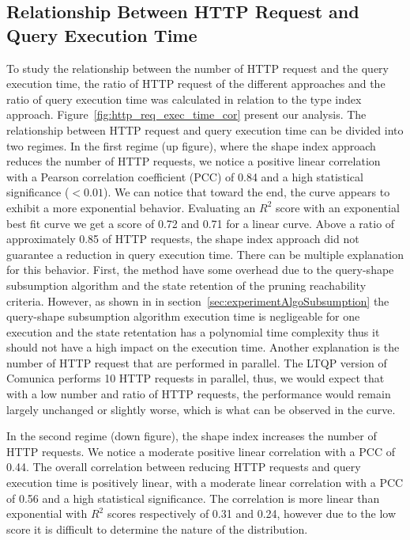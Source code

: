 \subsection{Relationship Between HTTP Request and Query Execution Time}


To study the relationship between the number of HTTP request and the query execution time, the ratio of HTTP request of the different approaches and the ratio of query execution time was 
calculated in relation to the type index approach.
Figure~\ref{fig:http_req_exec_time_cor} present our analysis.
The relationship between HTTP request and query execution time can be divided into two regimes.
In the first regime (up figure), where the shape index approach reduces the number of HTTP requests, we notice a positive linear correlation with a Pearson correlation coefficient (PCC) of 0.84 and a high statistical significance ($< 0.01$).
We can notice that toward the end, the curve appears to exhibit a more exponential behavior.
Evaluating an $R^2$ score with an exponential best fit curve we get a score of 0.72 and 0.71 for a linear curve.
Above a ratio of approximately 0.85 of HTTP requests, the shape index approach did not guarantee a reduction in query execution time.
There can be multiple explanation for this behavior.
First, the method have some overhead due to the query-shape subsumption algorithm and the state retention of the pruning reachability criteria.
However, as shown in in section~\ref{sec:experimentAlgoSubsumption} the query-shape subsumption algorithm execution time is negligeable for one execution and the state retentation has a polynomial time complexity thus it should not have a high impact on the execution time.
Another explanation is the number of HTTP request that are performed in parallel.
The LTQP version of Comunica performs 10 HTTP requests in parallel, thus, we would expect that with a low number and ratio of HTTP requests, the performance would remain largely unchanged or slightly worse, which is what can be observed in the curve.

In the second regime (down figure), the shape index increases the number of HTTP requests.
We notice a moderate positive linear correlation with a PCC of 0.44.
The overall correlation between reducing HTTP requests and query execution time is positively linear, with a moderate linear correlation with a PCC of 0.56 and a high statistical significance.
The correlation is more linear than exponential with $R^2$ scores respectively of 0.31 and 0.24, however due to the low score it is difficult to determine the nature of the distribution.


